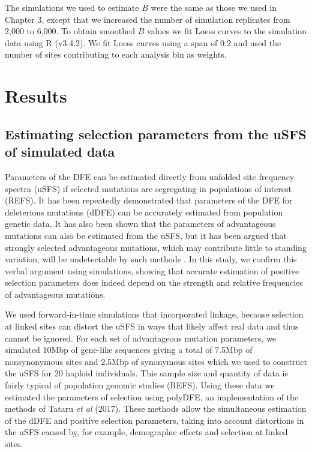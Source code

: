 \documentclass[11pt]{article}
\begin{document}
 	The simulations we used to estimate $B$ were the same as those we used in Chapter 3, except that we increased the number of simulation replicates from 2,000 to 6,000. To obtain smoothed $B$ values we fit Loess curves to the simulation data using R (v3.4.2). We fit Loess curves using a span of 0.2 and used the number of sites contributing to each analysis bin as weights.

%
%

\section*{Results}

\subsection*{Estimating selection parameters from the uSFS of simulated data}

	Parameters of the DFE can be estimated directly from unfolded site frequency spectra (uSFS) if selected mutations are segregating in populations of interest (REFS). It has been repeatedly demonstrated that parameters of the DFE for deleterious mutations (dDFE) can be accurately estimated from population genetic data. It has also been shown that the parameters of advantageous mutations can also be estimated from the uSFS, but it has been argued that strongly selected advantageous mutations, which may contribute little to standing variation, will be undetectable by such methods \citep{RN323}. In this study, we confirm this verbal argument using simulations, showing that accurate estimation of positive selection parameters does indeed depend on the strength and relative frequencies of advantageous mutations.
	
	We used forward-in-time simulations that incorporated linkage, because selection at linked sites can distort the uSFS in ways that likely affect real data and thus cannot be ignored. For each set of advantageous mutation parameters, we simulated 10Mbp of gene-like sequences giving a total of 7.5Mbp of nonsynonymous sites and 2.5Mbp of synonymous sites which we used to construct the uSFS for 20 haploid individuals. This sample size and quantity of data is fairly typical of population genomic studies (REFS). Using these data we estimated the parameters of selection using polyDFE, an implementation of the methods of Tataru \textit{et al} (2017). These methods allow the simultaneous estimation of the dDFE and positive selection parameters, taking into account distortions in the uSFS caused by, for example, demographic effects and selection at linked sites. 
\end{document}
